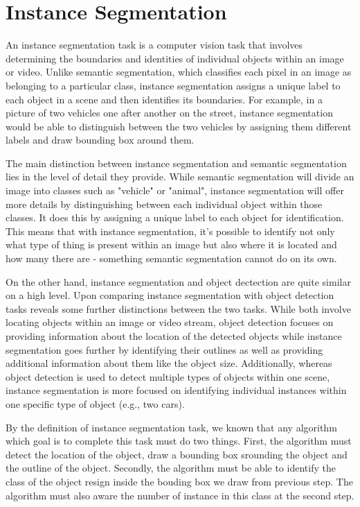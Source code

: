 \chapter{Instance Segmentation} \label{chap:instance_segmentation}

An instance segmentation task is a computer vision task that involves
determining the boundaries and identities of individual objects within an image
or video. Unlike semantic segmentation, which classifies each pixel in an image
as belonging to a particular class, instance segmentation assigns a unique
label to each object in a scene and then identifies its boundaries. For
example, in a picture of two vehicles one after another on the street, instance
segmentation would be able to distinguish between the two vehicles by assigning
them different labels and draw bounding box around them. 

The main distinction between instance segmentation and semantic segmentation
lies in the level of detail they provide. While semantic segmentation will
divide an image into classes such as "vehicle" or "animal", instance
segmentation will offer more details by distinguishing between each individual
object within those classes. It does this by assigning a unique label to each
object for identification. This means that with instance segmentation, it's
possible to identify not only what type of thing is present within an image but
also where it is located and how many there are - something semantic
segmentation cannot do on its own. 

On the other hand, instance segmentation and object dectection are quite
similar on a high level. Upon comparing instance segmentation with object
detection tasks reveals some further distinctions between the two tasks. While
both involve locating objects within an image or video stream, object detection
focuses on providing information about the location of the detected objects
while instance segmentation goes further by identifying their outlines as well
as providing additional information about them like the object size.
Additionally, whereas object detection is used to detect multiple types of
objects within one scene, instance segmentation is more focused on identifying
individual instances within one specific type of object (e.g., two cars).

By the definition of instance segmentation task, we known that any algorithm
which goal is to complete this task must do two things. First, the algorithm
must detect the location of the object, draw a bounding box srounding the
object and the outline of the object. Secondly, the algorithm must be able to
identify the class of the object resign inside the bouding box we draw from
previous step. The algorithm must also aware the number of instance in this
class at the second step.

